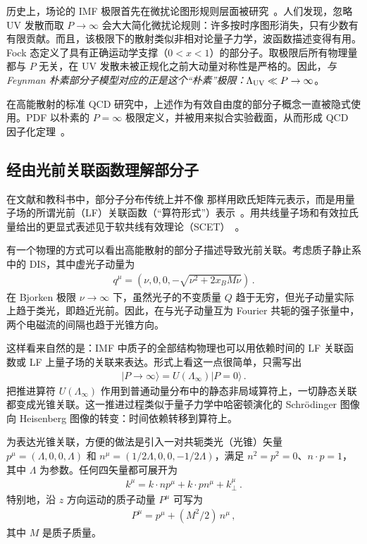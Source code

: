 历史上，场论的 IMF 极限首先在微扰论图形规则层面被研究~\cite{Weinberg:1966jm}。人们发现，忽略 UV 发散而取 $P\to\infty$ 会大大简化微扰论规则：许多按时序图形消失，只有少数有有限贡献。而且，该极限下的散射类似非相对论量子力学，波函数描述变得有用。Fock 态定义了具有正确运动学支撑（$0<x<1$）的部分子。取极限后所有物理量都与 $P$ 无关，在 UV 发散未被正规化之前大动量对称性是严格的。因此，{\it 与 Feynman 朴素部分子模型对应的正是这个``朴素''极限：$\Lambda_{\rm UV}\ll P\to \infty$}。

在高能散射的标准 QCD 研究中，上述作为有效自由度的部分子概念一直被隐式使用。PDF 以朴素的 $P=\infty$ 极限定义，并被用来拟合实验截面，从而形成 QCD 因子化定理~\cite{Collins:2011zzd}。

\subsection{经由光前关联函数理解部分子}
\label{sec:lc-imf}

在文献和教科书中，部分子分布传统上并不像  那样用欧氏矩阵元表示，而是用量子场的所谓光前（LF）关联函数（``算符形式''）表示~\cite{Brodsky:1997de,Collins:2011zzd}。用共线量子场和有效拉氏量给出的更显式表述见于软共线有效理论（SCET）~\cite{Bauer:2000yr,Bauer:2001ct,Bauer:2001yt}。

有一个物理的方式可以看出高能散射的部分子描述导致光前关联。考虑质子静止系中的 DIS，其中虚光子动量为
\begin{align}
	q^\mu = (\nu, 0, 0,  -\sqrt{\nu^2+2x_B M\nu}) \,.
\end{align}
在 Bjorken 极限 $\nu\to\infty$ 下，虽然光子的不变质量 $Q$ 趋于无穷，但光子动量实际上趋于类光，即趋近光前。因此，在与光子动量互为 Fourier 共轭的强子张量中，两个电磁流的间隔也趋于光锥方向。

这样看来自然的是：IMF 中质子的全部结构物理也可以用依赖时间的 LF 关联函数或 LF 上量子场的关联来表达。形式上看这一点很简单，只需写出
\begin{align}
	|P\to\infty\rangle = U(\Lambda_\infty) |P=0\rangle \,.
\end{align}
把推进算符 $U(\Lambda_\infty)$ 作用到普通动量分布中的静态非局域算符上，一切静态关联都变成光锥关联。这一推进过程类似于量子力学中哈密顿演化的 Schr\"odinger 图像向 Heisenberg 图像的转变：时间依赖转移到算符上。

为表达光锥关联，方便的做法是引入一对共轭类光（光锥）矢量 $p^\mu=(\Lambda,0,0,\Lambda)$ 和 $n^\mu=(1/2\Lambda,0,0,-1/2\Lambda)$，满足 $n^2=p^2=0$、$n\cdot p=1$，其中 $\Lambda$ 为参数。任何四矢量都可展开为
\begin{align}
	k^\mu = k\cdot n p^\mu + k\cdot p n^\mu  + k_\perp^\mu \ .
\end{align}
特别地，沿 $z$ 方向运动的质子动量 $P^\mu$ 可写为
\begin{align}
	P^\mu = p^\mu + (M^2/2)\, n^\mu \,,
\end{align}
其中 $M$ 是质子质量。

